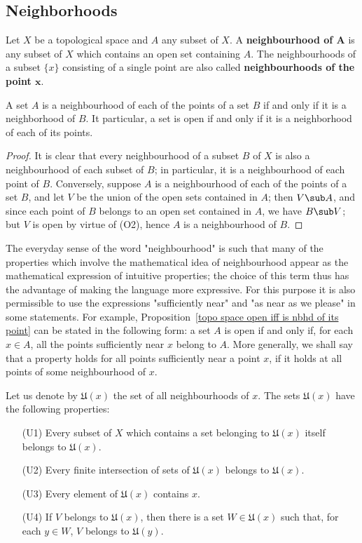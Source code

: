 \subsection{Neighborhoods}
Let $X$ be a topological space and $A$ any subset of $X$. A \textbf{neighbourhood of $\bm{A}$} is any subset of $X$ which contains an open set containing $A$. The neighbourhoods of a subset $\{x\}$ consisting of a single point are also called \textbf{neighbourhoods of the point $\bm{x}$}.\par
\begin{proposition}\label{topo space open iff is nbhd of its point}
A set $A$ is a neighbourhood of each of the points of a set $B$ if and only if it is a neighborhood of $B$. It particular, a set is open if and only if it is a neighborhood of each of its points.
\end{proposition}
\begin{proof}
It is clear that every neighbourhood of a subset $B$ of $X$ is also a neighbourhood of each subset of $B$; in particular, it is a neighbourhood of each point of $B$. Conversely, suppose $A$ is a neighbourhood of each of the points of a set $B$, and let $V$ be the union of the open sets contained in $A$; then $V\sub A$, and since each point of $B$ belongs to an open set contained in $A$, we have $B\sub V$; but $V$ is open by virtue of (O2), hence $A$ is a neighbourhood of $B$.
\end{proof}
\begin{remark}
The everyday sense of the word "neighbourhood" is such that many of the properties which involve the mathematical idea of neighbourhood appear as the mathematical expression of intuitive properties; the choice of this term thus has the advantage of making the language more expressive. For this purpose it is also permissible to use the expressions "sufficiently near" and "as near as we please" in some statements. For example, Proposition~\ref{topo space open iff is nbhd of its point} can be stated in the following form: a set $A$ is open if and only if, for each $x\in A$, all the points sufficiently near $x$ belong to $A$. More generally, we shall say that a property holds for all points sufficiently near a point $x$, if it holds at all points of some neighbourhood of $x$.
\end{remark}
Let us denote by $\mathfrak{U}(x)$ the set of all neighbourhoods of $x$. The sets $\mathfrak{U}(x)$ have the following properties:
\begin{enumerate}[leftmargin=35pt]
\item[(U1)] Every subset of $X$ which contains a set belonging to $\mathfrak{U}(x)$ itself belongs to $\mathfrak{U}(x)$.
\item[(U2)] Every finite intersection of sets of $\mathfrak{U}(x)$ belongs to $\mathfrak{U}(x)$.
\item[(U3)] Every element of $\mathfrak{U}(x)$ contains $x$.
\item[(U4)] If $V$ belongs to $\mathfrak{U}(x)$, then there is a set $W\in\mathfrak{U}(x)$ such that, for each $y\in W$, $V$ belongs to $\mathfrak{U}(y)$.
\end{enumerate}
